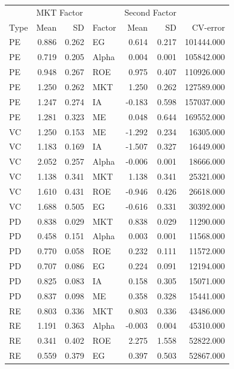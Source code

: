 \documentclass[12pt]{article}
\begin{document}
\begin{table}[ht]
	\centering
	\begin{tabular}{lrrlrrr}
		 & \multicolumn{2}{l}{MKT Factor} & & \multicolumn{2}{l}{Second Factor} & \\ 
		Type & Mean & SD & Factor & Mean & SD & CV-error \\ 
		\hline
		\hline
PE & 0.886 & 0.262 & EG & 0.614 & 0.217 & 101444.000 \\ 
PE & 0.719 & 0.205 & Alpha & 0.004 & 0.001 & 105842.000 \\ 
PE & 0.948 & 0.267 & ROE & 0.975 & 0.407 & 110926.000 \\ 
PE & 1.250 & 0.262 & MKT & 1.250 & 0.262 & 127589.000 \\ 
PE & 1.247 & 0.274 & IA & -0.183 & 0.598 & 157037.000 \\ 
PE & 1.281 & 0.323 & ME & 0.048 & 0.644 & 169552.000 \\ 
\hline
VC & 1.250 & 0.153 & ME & -1.292 & 0.234 & 16305.000 \\ 
VC & 1.183 & 0.169 & IA & -1.507 & 0.327 & 16449.000 \\ 
VC & 2.052 & 0.257 & Alpha & -0.006 & 0.001 & 18666.000 \\ 
VC & 1.138 & 0.341 & MKT & 1.138 & 0.341 & 25321.000 \\ 
VC & 1.610 & 0.431 & ROE & -0.946 & 0.426 & 26618.000 \\ 
VC & 1.688 & 0.505 & EG & -0.616 & 0.331 & 30392.000 \\ 
\hline
PD & 0.838 & 0.029 & MKT & 0.838 & 0.029 & 11290.000 \\ 
PD & 0.458 & 0.151 & Alpha & 0.003 & 0.001 & 11568.000 \\ 
PD & 0.770 & 0.058 & ROE & 0.232 & 0.111 & 11572.000 \\ 
PD & 0.707 & 0.086 & EG & 0.224 & 0.091 & 12194.000 \\ 
PD & 0.825 & 0.083 & IA & 0.158 & 0.305 & 15071.000 \\ 
PD & 0.837 & 0.098 & ME & 0.358 & 0.328 & 15441.000 \\ 
\hline
RE & 0.803 & 0.336 & MKT & 0.803 & 0.336 & 43486.000 \\ 
RE & 1.191 & 0.363 & Alpha & -0.003 & 0.004 & 45310.000 \\ 
RE & 0.341 & 0.402 & ROE & 2.275 & 1.558 & 52822.000 \\ 
RE & 0.559 & 0.379 & EG & 0.397 & 0.503 & 52867.000 \\ 

\end{tabular}
\end{table}
\end{document}
